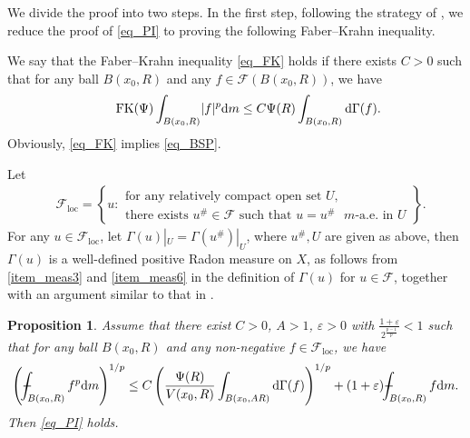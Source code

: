 \documentclass[10pt,a4paper]{amsart}
\numberwithin{equation}{section}
\def\Xint#1{\mathchoice
{\XXint\displaystyle\textstyle{#1}}%
{\XXint\textstyle\scriptstyle{#1}}%
{\XXint\scriptstyle\scriptscriptstyle{#1}}%
{\XXint\scriptscriptstyle\scriptscriptstyle{#1}}%
\!\int}
\def\XXint#1#2#3{{\setbox0=\hbox{$#1{#2#3}{\int}$ }
\vcenter{\hbox{$#2#3$ }}\kern-.6\wd0}}
\def\dashint{\Xint-}
\newtheorem{proposition}[theorem]{Proposition}
\begin{document}
We divide the proof into two steps. In the first step, following the strategy of \cite{EK26}, we reduce the proof of \ref{eq_PI} to proving the following Faber--Krahn inequality.

We say that the Faber--Krahn inequality \ref{eq_FK} holds if there exists $C>0$ such that for any ball $B(x_0,R)$ and any $f\in \mathcal{F}(B(x_0,R))$, we have
\begin{equation*}\label{eq_FK}\tag*{$\text{FK}(\Psi)$}
\int_{B(x_0,R)}\lvert f\rvert^p \mathrm{d}m\le C\Psi(R)\int_{B(x_0,R)} \mathrm{d}\Gamma(f).
\end{equation*}
Obviously, \ref{eq_FK} implies \ref{eq_BSP}.

Let
\begin{align*}
&\mathcal{F}_{\mathrm{loc}}=\left\{u:
\begin{array}{l}
\text{for any relatively compact open set }U,\\
\text{there exists }u^\#\in \mathcal{F}\text{ such that }u=u^\#\text{ }m\text{-a.e. in }U
\end{array}
\right\}.
\end{align*}
For any $u\in \mathcal{F}_{\mathrm{loc}}$, let $\Gamma(u)|_U=\Gamma(u^\#)|_U$, where $u^\#, U$ are given as above, then $\Gamma(u)$ is a well-defined positive Radon measure on $X$, as follows from \ref{item_meas3} and \ref{item_meas6} in the definition of $\Gamma(u)$ for $u\in \mathcal{F}$, together with an argument similar to that in \cite[Corollary 3.2.1]{FOT11}.


\begin{proposition}\label{prop_PI}
Assume that there exist $C>0$, $A>1$, $\varepsilon>0$ with $\frac{1+\varepsilon}{2^{\frac{p-1}{p}}}<1$ such that for any ball $B(x_0,R)$ and any non-negative $f\in \mathcal{F}_{\mathrm{loc}}$, we have
\begin{equation}\label{eq_weakPI}
\left(\dashint_{B(x_0,R)}f^p \mathrm{d}m\right)^{1/p}\le C\left(\frac{\Psi(R)}{V(x_0,R)}\int_{B(x_0,AR)} \mathrm{d}\Gamma(f)\right)^{1/p}+(1+\varepsilon) \dashint_{B(x_0,R)}f \mathrm{d}m.
\end{equation}
Then \ref{eq_PI} holds.
\end{proposition}
\end{document}
